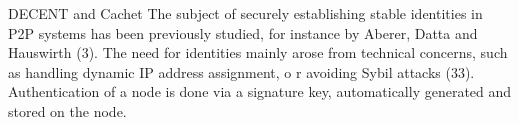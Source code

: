 \SuperNova

DECENT and Cachet
The subject of securely establishing stable identities in P2P systems has been previously 
studied, for instance by Aberer, Datta and Hauswirth (3). The need for identities 
mainly arose from technical concerns, such as handling dynamic IP address assignment, o
r avoiding Sybil attacks (33). Authentication of a node is done via a signature key, 
automatically generated and stored on the node.



